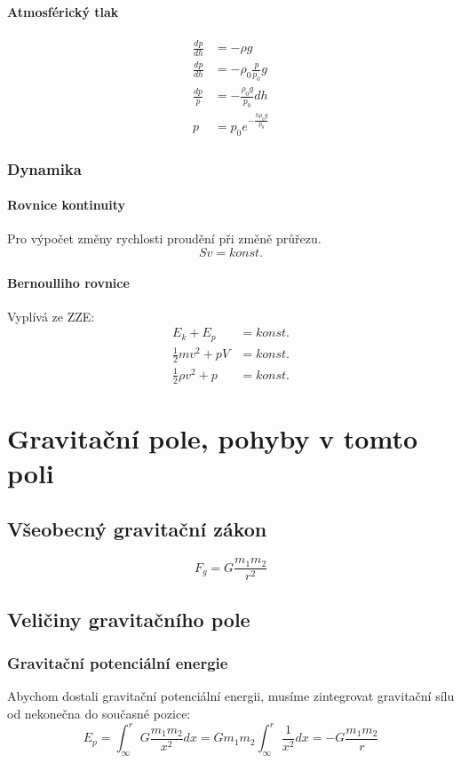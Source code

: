 \documentclass[titlepage]{book}
\begin{document}
\subsubsection{Atmosférický tlak}
\begin{align}
\frac{dp}{dh} &= -\rho g\\
\frac{dp}{dh} &= -\rho_0 \frac{p}{p_0} g\\
\frac{dp}{p} &= -\frac{\rho_0 g}{p_0} dh\\
p &= p_0 e^{-\frac{h \rho_0 g}{p_0}}
\end{align}
\subsection{Dynamika}
\subsubsection{Rovnice kontinuity}
Pro výpočet změny rychlosti proudění při změně průřezu.\\
\begin{equation}
Sv = konst.
\end{equation}
\subsubsection{Bernoulliho rovnice}
Vyplívá ze ZZE:\\
\begin{align}
E_k + E_p &= konst.\\
\frac{1}{2}mv^2 + p V &= konst.\\
\frac{1}{2} \rho v^2 + p &= konst.
\end{align}
\chapter{Gravitační pole, pohyby v tomto poli}
\section{Všeobecný gravitační zákon}
\begin{equation}
F_g = G \frac{m_1m_2}{r^2}
\end{equation}
\section{Veličiny gravitačního pole}
\subsection{Gravitační potenciální energie}
Abychom dostali gravitační potenciální energii, musíme zintegrovat gravitační sílu od nekonečna do současné pozice:\\
\begin{equation}
E_p = \int^r_{\infty} G \frac{m_1m_2}{x^2} dx = G m_1 m_2 \int^r_{\infty} \frac{1}{x^2} dx = -G\frac{m_1 m_2}{r}
\end{equation}
\end{document}
